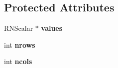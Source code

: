 \subsection*{Protected Attributes}
\begin{DoxyCompactItemize}
\item 
R\+N\+Scalar $\ast$ {\bfseries values}\hypertarget{class_r_n_dense_matrix_a274e640169c180113fa2d45f61270fc6}{}\label{class_r_n_dense_matrix_a274e640169c180113fa2d45f61270fc6}

\item 
int {\bfseries nrows}\hypertarget{class_r_n_dense_matrix_af4e0e0587a07e09485dbfeda267bdc38}{}\label{class_r_n_dense_matrix_af4e0e0587a07e09485dbfeda267bdc38}

\item 
int {\bfseries ncols}\hypertarget{class_r_n_dense_matrix_a26a8c01d1185f6bdc2b78e39bc3cfc57}{}\label{class_r_n_dense_matrix_a26a8c01d1185f6bdc2b78e39bc3cfc57}

\end{DoxyCompactItemize}
